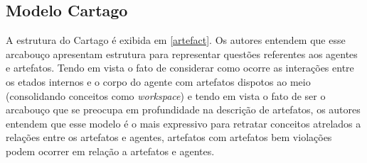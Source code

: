 \subsection{Modelo Cartago}

A estrutura do Cartago é exibida em \ref{artefact}. Os autores entendem que esse arcabouço apresentam estrutura para representar questões referentes aos agentes e artefatos. Tendo em vista o fato de considerar como ocorre as interações entre os etados internos e o corpo do agente com artefatos dispotos ao meio (consolidando conceitos como \textit{workspace}) e tendo em vista o fato de ser o arcabouço que se preocupa em profundidade na descrição de artefatos, os autores entendem que esse modelo é o mais expressivo para retratar conceitos atrelados a relações entre os artefatos e agentes, artefatos com artefatos bem  violações podem ocorrer em relação a artefatos e agentes.